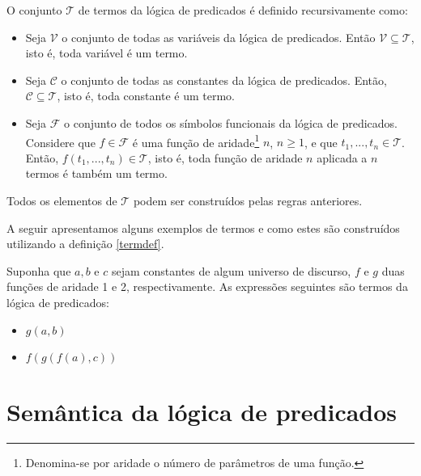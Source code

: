 \begin{Definition}\label{termdef}
O conjunto $\mathcal{T}$ de termos da lógica de predicados é definido
recursivamente como:
\begin{itemize}
  \item Seja $\mathcal{V}$ o conjunto de todas as variáveis da lógica
    de predicados. Então $\mathcal{V} \subseteq \mathcal{T}$, isto é,
    toda variável é um termo.
  \item Seja $\mathcal{C}$ o conjunto de todas as constantes da lógica
    de predicados. Então, $\mathcal{C}\subseteq\mathcal{T}$, isto é,
    toda constante é um termo.
  \item Seja $\mathcal{F}$ o conjunto de todos os símbolos funcionais
    da lógica de predicados. Considere que $f\in\mathcal{F}$ é uma
    função de aridade\footnote{Denomina-se por aridade o número de
      parâmetros de uma função.} $n$, $n\geq 1$, e que $t_1,...,t_n \in
    \mathcal{T}$. Então, $f(t_1,...,t_n)\in\mathcal{T}$, isto é, toda
    função de aridade $n$ aplicada a $n$ termos é também um termo.
\end{itemize}
Todos os elementos de $\mathcal{T}$ podem ser construídos pelas regras anteriores.
\end{Definition}
A seguir apresentamos alguns exemplos de termos e como estes são
construídos utilizando a definição \ref{termdef}.
\begin{Example}
Suponha que $a,b$ e $c$ sejam constantes de algum universo de
discurso, $f$ e $g$ duas funções de aridade 1 e 2, respectivamente. As
expressões seguintes são termos da lógica de predicados:
\begin{itemize}
  \item $g(a,b)$
  \item $f(g(f(a),c))$
\end{itemize}
\end{Example}

\section{Semântica da lógica de predicados}
